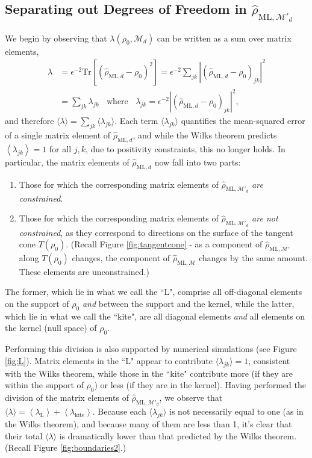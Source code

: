 \documentclass[aps,pra, twocolumn]{revtex4-1}
\newcommand{\M}{\mathcal{M}}
\newcommand{\expect}[1]{\ensuremath{\left\langle#1\right\rangle}}
\newcommand{\rhohat}{\hat{\rho}}
\newcommand{\rhoML}[1]{\rhohat_{\scriptscriptstyle{\mathrm{ML},#1}}}
\begin{document}
\subsection{Separating out Degrees of Freedom in $\rhoML{\M'_{d}}$}
\label{subsec:dof}
We begin by observing that $\lambda(\rho_{0}, \M_{d})$ can be written as a sum over matrix elements,
\begin{align}
\label{eq:llrserrors}
\nonumber \lambda &=\epsilon^{-2}\mathrm{Tr}[(\rhoML{d} - \rho_{0})^{2}] = \epsilon^{-2}\sum_{jk}|(\rhoML{d}- \rho_{0} )_{jk}|^{2}\\
&= \sum_{jk}\lambda_{jk}~~~~\text{where}~~~~\lambda_{jk} = \epsilon^{-2}|(\rhoML{d} - \rho_{0} )_{jk} |^{2},
\end{align}
and therefore $\langle \lambda \rangle = \sum_{jk}\langle\lambda_{jk}\rangle$.  Each term $\langle \lambda_{jk}\rangle$ quantifies the mean-squared error of a single matrix element of $\rhoML{d}$, and while the Wilks theorem predicts $\expect{\lambda_{jk}}=1$ for all $j,k$, due to positivity constraints, this no longer holds. In particular, the matrix elements of $\rhoML{d}$ now fall into two parts:

\begin{enumerate}[noitemsep]
\item Those for which the corresponding matrix elements of $\rhoML{\M'_{d}}$ \emph{are constrained}.
\item Those for which the corresponding matrix elements of $\rhoML{\M'_{d}}$ \emph{are not constrained}, as they correspond to directions on the surface of the tangent cone $T(\rho_{0})$. (Recall Figure \ref{fig:tangentcone} - as a component of $\rhoML{\M'}$ along $T(\rho_{0})$ changes, the component of $\rhoML{\M}$ changes by the same amount. These elements are unconstrained.)
\end{enumerate}
The former, which lie in what we call the ``L", comprise all off-diagonal elements on the support of $\rho_0$ \emph{and} between the support and the kernel, while the latter, which lie in what we call the ``kite", are all diagonal elements \emph{and} all elements on the kernel (null space) of $\rho_0$.

Performing this division is also supported by numerical simulations (see Figure \ref{fig:L}). Matrix elements in the ``L" appear to contribute $\langle \lambda_{jk}\rangle = 1$, consistent with the Wilks theorem, while those in the ``kite" contribute more (if they are within the support of $\rho_{0}$) or less (if they are in the kernel).  Having performed the division of the matrix elements of $\rhoML{\M'_{d}}$, we observe that $\langle\lambda\rangle = \expect{\lambda_{\mathrm{L}}} + \expect{\lambda_{\mathrm{kite}}}$. Because each $\langle \lambda_{jk}\rangle$ is not necessarily equal to one (as in the Wilks theorem), and because many of them are less than 1, it's clear that their total $\langle \lambda \rangle$ is dramatically lower than that predicted by the Wilks theorem. (Recall Figure \ref{fig:boundaries2}.)
\end{document}
